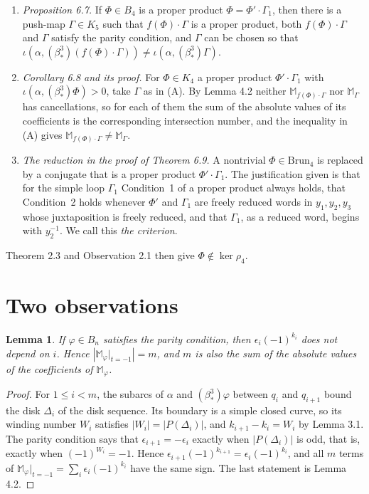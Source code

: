 \documentclass[11pt]{amsart}
\newtheorem{lemma}{Lemma}
\theoremstyle{remark}
\newcommand{\M}{\mathbb{M}}
\newcommand{\Brun}{\mathrm{Brun}}
\newcommand{\bs}{\beta^3_*}
\newcommand{\at}{\big|_{t=-1}}
\begin{document}
\begin{enumerate}
\item[(A)] \emph{Proposition 6.7.} If $\Phi\in B_4$ is a proper product $\Phi=\Phi'\cdot\Gamma_1$, then there is a push-map $\Gamma\in K_5$ such that $f(\Phi)\cdot\Gamma$ is a proper product, both $f(\Phi)\cdot\Gamma$ and $\Gamma$ satisfy the parity condition, and $\Gamma$ can be chosen so that $\iota(\alpha,(\bs)(f(\Phi)\cdot\Gamma))\neq\iota(\alpha,(\bs)\Gamma)$.
\item[(B)] \emph{Corollary 6.8 and its proof.} For $\Phi\in K_4$ a proper product $\Phi'\cdot\Gamma_1$ with $\iota(\alpha,(\bs)\Phi)>0$, take $\Gamma$ as in (A). By Lemma 4.2 neither $\M_{f(\Phi)\cdot\Gamma}$ nor $\M_\Gamma$ has cancellations, so for each of them the sum of the absolute values of its coefficients is the corresponding intersection number, and the inequality in (A) gives $\M_{f(\Phi)\cdot\Gamma}\neq\M_\Gamma$.
\item[(C)] \emph{The reduction in the proof of Theorem 6.9.} A nontrivial $\Phi\in\Brun_4$ is replaced by a conjugate that is a proper product $\Phi'\cdot\Gamma_1$. The justification given is that for the simple loop $\Gamma_1$ Condition~1 of a proper product always holds, that Condition~2 holds whenever $\Phi'$ and $\Gamma_1$ are freely reduced words in $y_1,y_2,y_3$ whose juxtaposition is freely reduced, and that $\Gamma_1$, as a reduced word, begins with $y_2^{-1}$. We call this \emph{the criterion}.
\end{enumerate}
Theorem 2.3 and Observation 2.1 then give $\Phi\notin\ker\rho_4$.

\section{Two observations}

\begin{lemma}\label{lem:sign}
If $\varphi\in B_n$ satisfies the parity condition, then $\epsilon_i(-1)^{k_i}$ does not depend on $i$. Hence $|\M_\varphi\at|=m$, and $m$ is also the sum of the absolute values of the coefficients of $\M_\varphi$.
\end{lemma}

\begin{proof}
For $1\le i<m$, the subarcs of $\alpha$ and $(\bs)\varphi$ between $q_i$ and $q_{i+1}$ bound the disk $\Delta_i$ of the disk sequence. Its boundary is a simple closed curve, so its winding number $W_i$ satisfies $|W_i|=|P(\Delta_i)|$, and $k_{i+1}-k_i=W_i$ by Lemma 3.1. The parity condition says that $\epsilon_{i+1}=-\epsilon_i$ exactly when $|P(\Delta_i)|$ is odd, that is, exactly when $(-1)^{W_i}=-1$. Hence $\epsilon_{i+1}(-1)^{k_{i+1}}=\epsilon_i(-1)^{k_i}$, and all $m$ terms of $\M_\varphi\at=\sum_i\epsilon_i(-1)^{k_i}$ have the same sign. The last statement is Lemma 4.2.
\end{proof}
\end{document}
